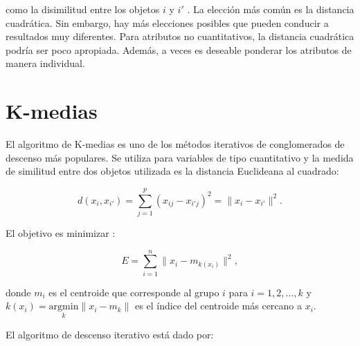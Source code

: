 como la disimilitud entre los objetos $i$ y $i'$ \citep{hastie09}. La elección más común es la distancia cuadrática. Sin embargo, hay más elecciones posibles que pueden conducir a resultados muy diferentes. Para atributos no cuantitativos, la distancia cuadrática podría ser poco apropiada. Además, a veces es deseable ponderar los atributos de manera individual.

\section{K-medias}
El algoritmo de K-medias es uno de los métodos iterativos de conglomerados de descenso más populares. Se utiliza para variables de tipo cuantitativo y la medida de similitud entre dos objetos utilizada es la distancia Euclideana al cuadrado:

\begin{equation}
d(x_{i},x_{i'})= \sum_{j=1}^p (x_{ij}-x_{i'j})^2 = \| x_{i}-x_{i'} \|^2.
\end{equation}



El objetivo es minimizar :


\begin{equation}\label{eq:kmedias}
E = \sum_{i=1}^{n} \| x_{i} - m_{k(x_{i})} \| ^2,
\end{equation}



donde $m_{i}$ es el centroide que corresponde al grupo $i$ para $i=1, 2, \dots, k$  y $k(x_{i})=\underset{k}{\textrm{argmin}} \| x_{i}-m_{k} \| $ es el índice del centroide más cercano a $x_{i}$.

El algoritmo de descenso iterativo está dado por:

